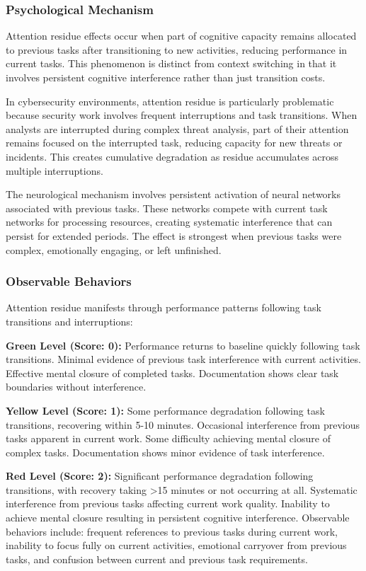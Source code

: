 \documentclass[11pt,a4paper]{article}
\begin{document}
\subsubsection{Psychological Mechanism}

Attention residue effects occur when part of cognitive capacity remains allocated to previous tasks after transitioning to new activities, reducing performance in current tasks\cite{leroy2009}. This phenomenon is distinct from context switching in that it involves persistent cognitive interference rather than just transition costs.

In cybersecurity environments, attention residue is particularly problematic because security work involves frequent interruptions and task transitions. When analysts are interrupted during complex threat analysis, part of their attention remains focused on the interrupted task, reducing capacity for new threats or incidents. This creates cumulative degradation as residue accumulates across multiple interruptions.

The neurological mechanism involves persistent activation of neural networks associated with previous tasks\cite{wylie2000}. These networks compete with current task networks for processing resources, creating systematic interference that can persist for extended periods. The effect is strongest when previous tasks were complex, emotionally engaging, or left unfinished.

\subsubsection{Observable Behaviors}

Attention residue manifests through performance patterns following task transitions and interruptions:

\textbf{Green Level (Score: 0):} Performance returns to baseline quickly following task transitions. Minimal evidence of previous task interference with current activities. Effective mental closure of completed tasks. Documentation shows clear task boundaries without interference.

\textbf{Yellow Level (Score: 1):} Some performance degradation following task transitions, recovering within 5-10 minutes. Occasional interference from previous tasks apparent in current work. Some difficulty achieving mental closure of complex tasks. Documentation shows minor evidence of task interference.

\textbf{Red Level (Score: 2):} Significant performance degradation following transitions, with recovery taking >15 minutes or not occurring at all. Systematic interference from previous tasks affecting current work quality. Inability to achieve mental closure resulting in persistent cognitive interference. Observable behaviors include: frequent references to previous tasks during current work, inability to focus fully on current activities, emotional carryover from previous tasks, and confusion between current and previous task requirements.
\end{document}
